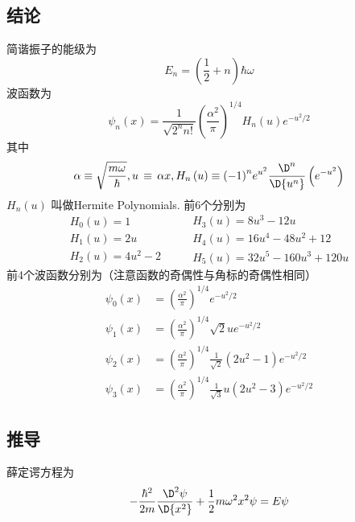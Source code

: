 \subsection{结论}

简谐振子的能级为
\begin{equation}
{E_n} = \left( {\frac{1}{2} + n} \right)\hbar \omega 
\end{equation}
波函数为
\begin{equation}
{\psi _n}\left( x \right) = \frac{1}{{\sqrt {{2^n}n!} }}{\left( {\frac{{{\alpha ^2}}}{\pi }} \right)^{1/4}}{H_n}\left( u \right){e^{ - {u^2}/2}}
\end{equation}
其中
\begin{equation}
\alpha  \equiv \sqrt {\frac{{m\omega }}{\hbar }} , u\, \equiv \,\alpha x, {H_n}\left( u \right) \equiv {\left( { - 1} \right)^n}{e^{{u^2}}}\frac{{{\D^n}}}{{\D{u^n}}}\left( {{e^{ - {u^2}}}} \right)
\end{equation}
${H_n}\left( u \right)$ 叫做Hermite Polynomials. 前6个分别为
\begin{equation}
\begin{array}{l}
{H_0}\left( u \right) = 1\\
{H_1}\left( u \right) = 2u\\
{H_2}\left( u \right) = 4{u^2} - 2
\end{array}
\qquad
\begin{array}{l}
{H_3}\left( u \right) = 8{u^3} - 12u\\
{H_4}\left( u \right) = 16{u^4} - 48{u^2} + 12\\
{H_5}\left( u \right) = 32{u^5} - 160{u^3} + 120u
\end{array}
\end{equation}
前4个波函数分别为（注意函数的奇偶性与角标的奇偶性相同）
\begin{equation}\begin{aligned}
{\psi _0}\left( x \right) &= {\left( {\frac{{{\alpha ^2}}}{\pi }} \right)^{1/4}}{e^{ - {u^2}/2}}\\
{\psi _1}\left( x \right) &= {\left( {\frac{{{\alpha ^2}}}{\pi }} \right)^{1/4}}\sqrt 2 u{e^{ - {u^2}/2}} \\
{\psi _2}\left( x \right) &= {\left( {\frac{{{\alpha ^2}}}{\pi }} \right)^{1/4}}\frac{1}{{\sqrt 2 }}\left( {2{u^2} - 1} \right){e^{ - {u^2}/2}}\\
{\psi _3}\left( x \right) &= {\left( {\frac{{{\alpha ^2}}}{\pi }} \right)^{1/4}}\frac{1}{{\sqrt 3 }}u\left( {2{u^2} - 3} \right){e^{ - {u^2}/2}}
\end{aligned}\end{equation}
\subsection{推导}%

薛定谔方程为
\begin{equation}
- \frac{{{\hbar ^2}}}{{2m}}\frac{{{\D^2}\psi }}{{\D{x^2}}} + \frac{1}{2}m{\omega ^2}{x^2}\psi  = E\psi
\end{equation}